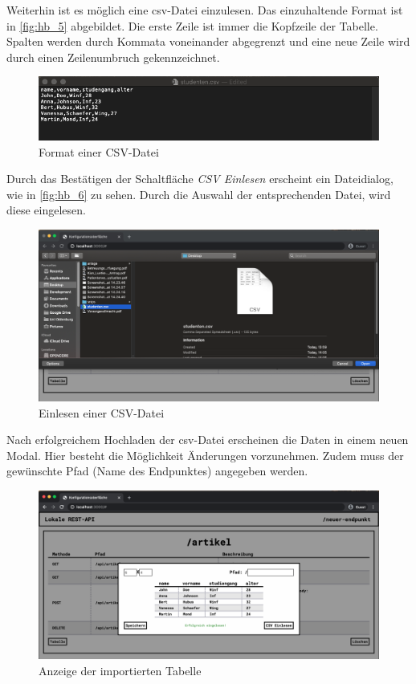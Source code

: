 Weiterhin ist es möglich eine \gls{csv}-Datei einzulesen. Das einzuhaltende Format ist in \autoref{fig:hb_5} abgebildet. Die erste Zeile ist immer die Kopfzeile der Tabelle. Spalten werden durch Kommata voneinander abgegrenzt und eine neue Zeile wird durch einen Zeilenumbruch gekennzeichnet. 

\begin{figure}[H]
    \centering
    \includegraphics[width=15cm]{figures/hb_5.png}    %
    \caption{Format einer CSV-Datei}
    \label{fig:hb_5}
\end{figure}

Durch das Bestätigen der Schaltfläche \textit{CSV Einlesen} erscheint ein Dateidialog, wie in \autoref{fig:hb_6} zu sehen. Durch die Auswahl der entsprechenden Datei, wird diese eingelesen.

\begin{figure}[H]
    \centering
    \includegraphics[width=15cm]{figures/hb_6.png}    %
    \caption{Einlesen einer CSV-Datei}
    \label{fig:hb_6}
\end{figure}

Nach erfolgreichem Hochladen der \gls{csv}-Datei erscheinen die Daten in einem neuen Modal. Hier besteht die Möglichkeit Änderungen vorzunehmen. Zudem muss der gewünschte Pfad (Name des Endpunktes) angegeben werden.

\begin{figure}[H]
    \centering
    \includegraphics[width=15cm]{figures/hb_7.png}    %
    \caption{Anzeige der importierten Tabelle}
    \label{fig:hb_7}
\end{figure}

